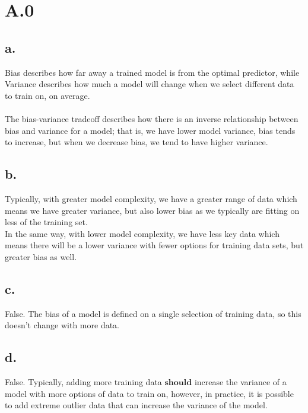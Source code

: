 \documentclass{article}
\date{{}}
\newcommand{\1}{\mathbf{1}}
\begin{document}
\thispagestyle{firstpageheader}

\section*{A.0}
{\Large 

\subsection*{a.}

Bias describes how far away a trained model is from the optimal predictor, while Variance describes how much a model will change when we select different data to train on, on average. \\ \\
The bias-variance tradeoff describes how there is an inverse relationship between bias and variance for a model; that is, we have lower model variance, bias tends to increase, but when we decrease bias, we tend to have higher variance. 

\subsection*{b.}

Typically, with greater model complexity, we have a greater range of data which means we have greater variance, but also lower bias as we typically are fitting on less of the training set. \\
In the same way, with lower model complexity, we have less key data which means there will be a lower variance with fewer options for training data sets, but greater bias as well.

\subsection*{c.}

False. The bias of a model is defined on a single selection of training data, so this doesn't change with more data.

\subsection*{d.}

False. Typically, adding more training data $\textbf{should}$ increase the variance of a model with more options of data to train on, however, in practice, it is possible to add extreme outlier data that can increase the variance of the model.

}
\end{document}
